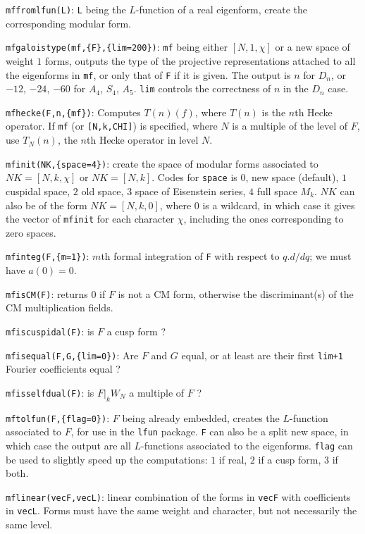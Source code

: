 \documentclass[11pt]{article}
\def\kbd#1{{\tt #1}}
\begin{document}
\kbd{mffromlfun(L)}: \kbd{L} being the $L$-function of a real eigenform,
create the corresponding modular form.

\kbd{mfgaloistype(mf,\{F\},\{lim=200\})}: \kbd{mf} being either $[N,1,\chi]$ or
a new space of weight $1$ forms, outputs the type of the projective
representations attached to all the eigenforms in \kbd{mf}, or only that of
\kbd{F} if it is given. The output is $n$ for $D_n$, or $-12$, $-24$, $-60$ for
$A_4$, $S_4$, $A_5$. \kbd{lim} controls the correctness of $n$ in the $D_n$
case.

\kbd{mfhecke(F,n,\{mf\})}: Computes $T(n)(f)$, where $T(n)$ is the $n$th Hecke
operator. If \kbd{mf} (or \kbd{[N,k,CHI]}) is specified, where $N$ is a
multiple of the level of $F$, use $T_N(n)$, the $n$th Hecke operator
in level $N$.

\kbd{mfinit(NK,\{space=4\})}: create the space of modular forms associated to
$NK=[N,k,\chi]$ or $NK=[N,k]$. Codes for \kbd{space} is $0$, new space
(default), $1$ cuspidal space, $2$ old space, $3$ space of Eisenstein series,
$4$ full space $M_k$. $NK$ can also be of the form $NK=[N,k,0]$,
where $0$ is a wildcard, in which case it gives the vector of \kbd{mfinit}
for each character $\chi$, including the ones corresponding to zero spaces.

\kbd{mfinteg(F,\{m=1\})}: $m$th formal integration of \kbd{F} with respect
to $q.d/dq$; we must have $a(0)=0$.

\kbd{mfisCM(F)}: returns $0$ if $F$ is not a CM form, otherwise the
discriminant(s) of the CM multiplication fields.

\kbd{mfiscuspidal(F)}: is $F$ a cusp form ?

\kbd{mfisequal(F,G,\{lim=0\})}: Are $F$ and $G$ equal, or at least are their
first \kbd{lim+1} Fourier coefficients equal ?

\kbd{mfisselfdual(F)}: is $F|_kW_N$ a multiple of $F$ ?

\kbd{mftolfun(F,\{flag=0\})}: $F$ being already embedded, creates the
$L$-function associated to $F$, for use in the \kbd{lfun} package.
\kbd{F} can also be a split new space, in which case the output are
all $L$-functions associated to the eigenforms. \kbd{flag} can be used to
slightly speed up the computations: $1$ if real, $2$ if a cusp form,
$3$ if both.

\kbd{mflinear(vecF,vecL)}: linear combination of the forms in \kbd{vecF}
with coefficients in \kbd{vecL}. Forms must have the same weight and
character, but not necessarily the same level.
\end{document}
